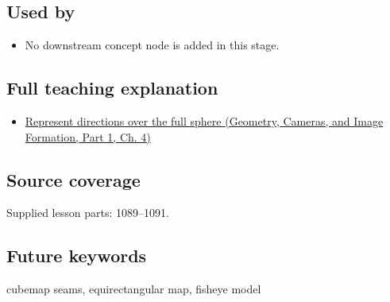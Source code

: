 \subsection{Used by}\label{appendix-fc99ad39f351-used-by}

\hypertarget{appendix-fc99ad39f351-used-by}{}

\begin{itemize}
\tightlist
\item
  No downstream concept node is added in this stage.
\end{itemize}

\subsection{Full teaching explanation}\label{appendix-fc99ad39f351-full-teaching-explanation}

\hypertarget{appendix-fc99ad39f351-full-teaching-explanation}{}

\begin{itemize}
\tightlist
\item
  \href{../03-Geometry-Cameras-and-Image-Formation-P01/main.pdf\#02-foundations-ii-ch035-represent-directions-over-the-full-sphere}{Represent directions over the full sphere (Geometry, Cameras, and Image Formation, Part 1, Ch. 4)}
\end{itemize}

\subsection{Source coverage}\label{appendix-fc99ad39f351-source-coverage}

\hypertarget{appendix-fc99ad39f351-source-coverage}{}

Supplied lesson parts: 1089--1091.

\subsection{Future keywords}\label{appendix-fc99ad39f351-future-keywords}

\hypertarget{appendix-fc99ad39f351-future-keywords}{}

cubemap seams, equirectangular map, fisheye model

